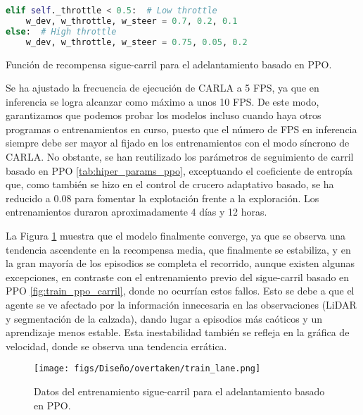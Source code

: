 \begin{code}[h]
\begin{lstlisting}[language=Python]
elif self._throttle < 0.5:  # Low throttle
    w_dev, w_throttle, w_steer = 0.7, 0.2, 0.1
else:  # High throttle
    w_dev, w_throttle, w_steer = 0.75, 0.05, 0.2
\end{lstlisting}
\caption[Función de recompensa sigue-carril para el adelantamiento basado en \ac{PPO}]{Función de recompensa sigue-carril para el adelantamiento basado en \ac{PPO}.}
\label{cod:rew_ppo_lane_overtaken}
\end{code}

Se ha ajustado la frecuencia de ejecución de CARLA a 5 \ac{FPS}, ya que en inferencia se logra alcanzar como máximo a unos 10 \ac{FPS}. De este modo, garantizamos que podemos probar los modelos incluso cuando haya otros programas o entrenamientos en curso, puesto que el número de \ac{FPS} en inferencia siempre debe ser mayor al fijado en los entrenamientos con el modo síncrono de CARLA. No obstante, se han reutilizado los parámetros de seguimiento de carril basado en \ac{PPO} \ref{tab:hiper_params_ppo}, exceptuando el coeficiente de entropía que, como también se hizo en el control de crucero adaptativo basado, se ha reducido a 0.08 para fomentar la explotación frente a la exploración. Los entrenamientos duraron aproximadamente 4 días y 12 horas.

La Figura \ref{fig:train_lane_overtaken} muestra que el modelo finalmente converge, ya que 
se observa una tendencia ascendente en la recompensa media, que finalmente se estabiliza, y
en la gran mayoría de los episodios se completa el recorrido, aunque existen algunas excepciones, en contraste con el entrenamiento previo del sigue-carril basado en \ac{PPO} \ref{fig:train_ppo_carril}, donde no ocurrían estos fallos. Esto se debe a que el agente se ve afectado por la información innecesaria en las observaciones (\ac{LiDAR} y segmentación de la calzada), dando lugar a episodios más caóticos y un aprendizaje menos estable. Esta inestabilidad también se refleja en la gráfica de velocidad, donde se observa una tendencia errática.

\begin{figure}[ht]
\centering
\texttt{[image: figs/Diseño/overtaken/train\_lane.png]}
\caption{Datos del entrenamiento sigue-carril para el adelantamiento basado en \ac{PPO}.}
\label{fig:train_lane_overtaken}
\end{figure}

